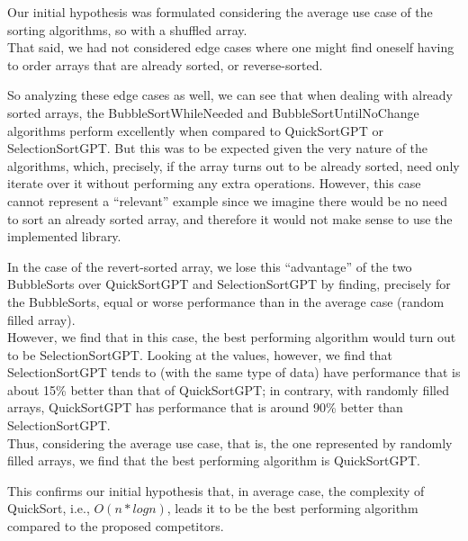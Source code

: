 \documentclass{article}
\begin{document}
Our initial hypothesis was formulated considering the average use case of the sorting algorithms, so with a shuffled array. \\

That said, we had not considered edge cases where one might find oneself having to order arrays that are already sorted, or reverse-sorted.

So analyzing these edge cases as well, we can see that when dealing with already sorted arrays, the BubbleSortWhileNeeded and BubbleSortUntilNoChange algorithms perform excellently when compared to QuickSortGPT or SelectionSortGPT. But this was to be expected given the very nature of the algorithms, which, precisely, if the array turns out to be already sorted, need only iterate over it without performing any extra operations. However, this case cannot represent a “relevant” example since we imagine there would be no need to sort an already sorted array, and therefore it would not make sense to use the implemented library.

In the case of the revert-sorted array, we lose this “advantage” of the two BubbleSorts over QuickSortGPT and SelectionSortGPT by finding, precisely for the BubbleSorts, equal or worse performance than in the average case (random filled array). \\
However, we find that in this case, the best performing algorithm would turn out to be SelectionSortGPT. Looking at the values, however, we find that SelectionSortGPT tends to (with the same type of data) have performance that is about 15\% better than that of QuickSortGPT; in contrary, with randomly filled arrays, QuickSortGPT has performance that is around 90\% better than SelectionSortGPT.\\

Thus, considering the average use case, that is, the one represented by randomly filled arrays, we find that the best performing algorithm is QuickSortGPT.

This confirms our initial hypothesis that, in average case, the complexity of QuickSort, i.e., $O(n*logn)$, leads it to be the best performing algorithm compared to the proposed competitors.
\end{document}
